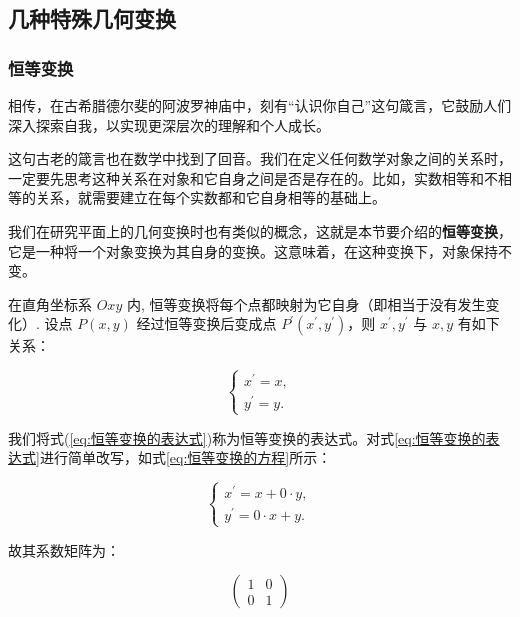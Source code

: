 \documentclass[lang=cn,newtx,10pt,scheme=chinese]{elegantbook}
\begin{document}
\subsection{几种特殊几何变换}
\label{subsec:几种特殊几何变换}

\subsubsection{恒等变换}
\label{subsubsec:恒等变换}

相传，在古希腊德尔斐的阿波罗神庙中，刻有“认识你自己”这句箴言，它鼓励人们深入探索自我，以实现更深层次的理解和个人成长。

这句古老的箴言也在数学中找到了回音。我们在定义任何数学对象之间的关系时，一定要先思考这种关系在对象和它自身之间是否是存在的。比如，实数相等和不相等的关系，就需要建立在每个实数都和它自身相等的基础上。

我们在研究平面上的几何变换时也有类似的概念，这就是本节要介绍的\textcolor{third}{\bf 恒等变换}，它是一种将一个对象变换为其自身的变换。这意味着，在这种变换下，对象保持不变。

 在直角坐标系 $O x y$ 内, 恒等变换将每个点都映射为它自身（即相当于没有发生变化）. 设点 $P(x, y)$ 经过恒等变换后变成点 $P^{\prime}\left(x^{\prime}, y^{\prime}\right)$，则 $x^{\prime}, y^{\prime}$ 与 $x, y$ 有如下关系：

\begin{equation}
\left\{\begin{array}{l}
x^{\prime}=x, \\
y^{\prime}=y .
\end{array}\right.
\label{eq:恒等变换的表达式}
\end{equation}

我们将式(\ref{eq:恒等变换的表达式})称为恒等变换的表达式。对式\ref{eq:恒等变换的表达式}进行简单改写，如式\ref{eq:恒等变换的方程}所示：

\begin{equation}
\left\{\begin{array}{l}
x^{\prime}=x + 0\cdot y, \\
y^{\prime}= 0\cdot x + y .
\end{array}\right.
\label{eq:恒等变换的方程}
\end{equation}

故其系数矩阵为：

\begin{equation}
\left(\begin{array}{rr}
1  & 0 \\
0  & 1
\end{array}\right)
\label{eq:恒等变换矩阵}
\end{equation}
\end{document}
